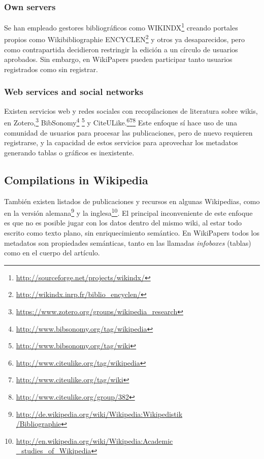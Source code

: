 \documentclass[11pt,twocolumn]{article}
\begin{document}
\subsubsection{Own servers}
Se han empleado gestores bibliográficos como WIKINDX\footnote{\href{http://sourceforge.net/projects/wikindx/}{http://sourceforge.net/projects/wikindx/}} creando portales propios como Wikibibliographie ENCYCLEN\footnote{\href{http://wikindx.inrp.fr/biblio_encyclen/}{http://wikindx.inrp.fr/biblio\_encyclen/}} y otros ya desaparecidos, pero como contrapartida decidieron restringir la edición a un círculo de usuarios aprobados. Sin embargo, en WikiPapers pueden participar tanto usuarios registrados como sin registrar.


\subsubsection{Web services and social networks}
Existen servicios web y redes sociales con recopilaciones de literatura sobre wikis, en Zotero,\footnote{\href{https://www.zotero.org/groups/wikipedia_research}{https://www.zotero.org/groups/wikipedia\_research}} BibSonomy\footnote{\href{http://www.bibsonomy.org/tag/wikipedia}{http://www.bibsonomy.org/tag/wikipedia}} \footnote{\href{http://www.bibsonomy.org/tag/wiki}{http://www.bibsonomy.org/tag/wiki}} y CiteULike.\footnote{\href{http://www.citeulike.org/tag/wikipedia}{http://www.citeulike.org/tag/wikipedia}}\footnote{\href{http://www.citeulike.org/tag/wiki}{http://www.citeulike.org/tag/wiki}}\footnote{\href{http://www.citeulike.org/group/382}{http://www.citeulike.org/group/382}} Este enfoque sí hace uso de una comunidad de usuarios para procesar las publicaciones, pero de nuevo requieren registrarse, y la capacidad de estos servicios para aprovechar los metadatos generando tablas o gráficos es inexistente.

\subsection{Compilations in Wikipedia}
También existen listados de publicaciones y recursos en algunas Wikipedias, como en la versión alemana\footnote{\href{http://de.wikipedia.org/wiki/Wikipedia:Wikipedistik/Bibliographie}{http://de.wikipedia.org/wiki/Wikipedia:Wikipedistik\\ /Bibliographie}} y la inglesa\footnote{\href{http://en.wikipedia.org/wiki/Wikipedia:Academic_studies_of_Wikipedia}{http://en.wikipedia.org/wiki/Wikipedia:Academic\\ \_studies\_of\_Wikipedia}}. El principal inconveniente de este enfoque es que no es posible jugar con los datos dentro del mismo wiki, al estar todo escrito como texto plano, sin enriquecimiento semántico. En WikiPapers todos los metadatos son propiedades semánticas, tanto en las llamadas \emph{infoboxes} (tablas) como en el cuerpo del artículo.
\end{document}
